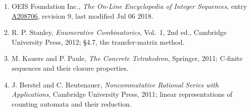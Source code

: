 \documentclass[11pt]{article}
\theoremstyle{definition}
\begin{document}
\begin{enumerate}

\item OEIS Foundation Inc., \emph{The On-Line Encyclopedia of Integer Sequences}, entry \href{https://oeis.org/A208706}{A208706}, revision 9, last modified Jul 06 2018.

\item R. P. Stanley, \emph{Enumerative Combinatorics}, Vol.~1, 2nd ed., Cambridge University Press, 2012; \S4.7, the transfer-matrix method.

\item M. Kauers and P. Paule, \emph{The Concrete Tetrahedron}, Springer, 2011; C-finite sequences and their closure properties.

\item J. Berstel and C. Reutenauer, \emph{Noncommutative Rational Series with Applications}, Cambridge University Press, 2011; linear representations of counting automata and their reduction.

\end{enumerate}
\end{document}
